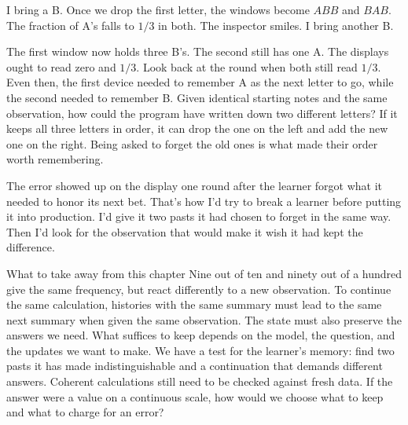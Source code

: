 I bring a B. Once we drop the first letter, the windows become $ABB$ and $BAB$. The fraction of A's falls to $1/3$ in both. The inspector smiles. I bring another B.

The first window now holds three B's. The second still has one A. The displays ought to read zero and $1/3$. Look back at the round when both still read $1/3$. Even then, the first device needed to remember A as the next letter to go, while the second needed to remember B. Given identical starting notes and the same observation, how could the program have written down two different letters? If it keeps all three letters in order, it can drop the one on the left and add the new one on the right. Being asked to forget the old ones is what made their order worth remembering.

The error showed up on the display one round after the learner forgot what it needed to honor its next bet. That's how I'd try to break a learner before putting it into production. I'd give it two pasts it had chosen to forget in the same way. Then I'd look for the observation that would make it wish it had kept the difference.

\begin{quadro}{What to take away from this chapter}
 Nine out of ten and ninety out of a hundred give the same frequency, but react differently to a new observation.
 To continue the same calculation, histories with the same summary must lead to the same next summary when given the same observation.
 The state must also preserve the answers we need. What suffices to keep depends on the model, the question, and the updates we want to make.
 We have a test for the learner's memory: find two pasts it has made indistinguishable and a continuation that demands different answers. Coherent calculations still need to be checked against fresh data.
 If the answer were a value on a continuous scale, how would we choose what to keep and what to charge for an error?
\end{quadro}
